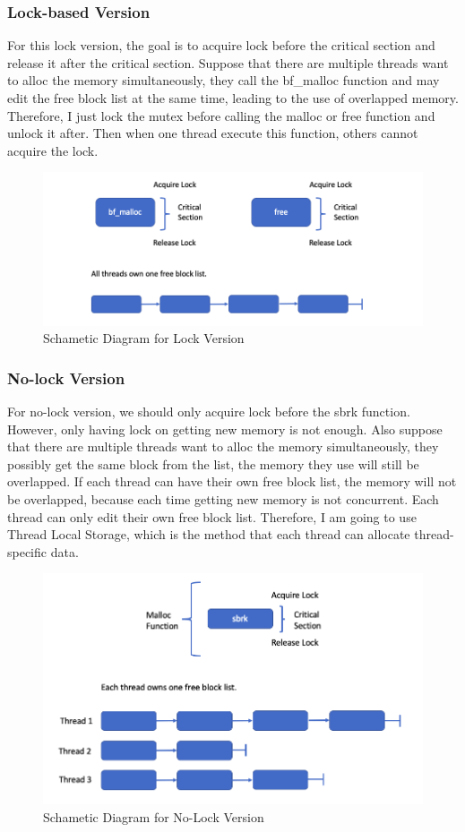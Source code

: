 \documentclass[a4paper,10pt]{article}
\begin{document}
    \subsubsection{Lock-based Version}
    \par For this lock version, the goal is to acquire lock before the critical
    section and release it after the critical section. Suppose that there are multiple
    threads want to alloc the memory simultaneously, they call the bf\_malloc function
    and may edit the free block list at the same time, leading to the use of overlapped 
    memory. Therefore, I just lock the mutex before calling the malloc or free function 
    and unlock it after. Then when one thread execute this function, others cannot acquire 
    the lock.
    \begin{figure}[H]
      \centering
      \includegraphics[width=0.6\linewidth]{lock.png}
      \caption{Schametic Diagram for Lock Version}
    \end{figure}

    \subsubsection{No-lock Version} 
    \par For no-lock version, we should only acquire lock before the sbrk function. 
    However, only having lock on getting new memory is not enough. Also suppose that 
    there are multiple threads want to alloc the memory simultaneously, they possibly
    get the same block from the list, the memory they use will still be overlapped. 
    If each thread can have their own free block list, the memory will not
    be overlapped, because each time getting new memory is not concurrent. Each thread
    can only edit their own free block list. Therefore, I am going to use Thread Local 
    Storage, which is the method that each thread can allocate thread-specific data.
    \begin{figure}[H]
      \centering
      \includegraphics[width=0.6\linewidth]{nolock.png}
      \caption{Schametic Diagram for No-Lock Version}
    \end{figure}
\end{document}

